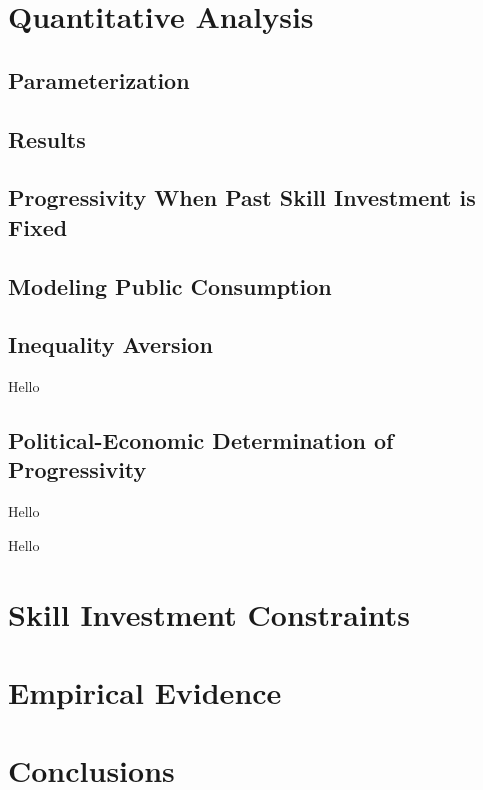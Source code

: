 \documentclass{article}
\begin{document}
\section{Quantitative Analysis}

\subsection{Parameterization}

\subsection{Results}

\subsection{Progressivity When Past Skill Investment is Fixed}

\subsection{Modeling Public Consumption}

\subsection{Inequality Aversion}

{
\proposition Hello

}

\subsection{Political-Economic Determination of Progressivity}

{
\proposition Hello

}

{
\proposition Hello

}

\section{Skill Investment Constraints}

\section{Empirical Evidence}

\section{Conclusions}
\end{document}

